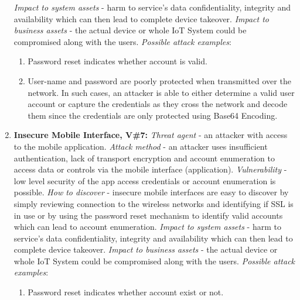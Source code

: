 \documentclass[12pt]{article}
\begin{document}
\begin{enumerate}
		\newline \textit{Impact to system assets} - harm to service’s data confidentiality, integrity and availability	which can then lead to complete device takeover.
		\newline \textit{Impact to business assets} - the actual device or whole IoT System could be compromised along with the users.
		\newline \textit{Possible attack examples}:
		\begin{enumerate}[label=(\roman*)]
			\item Password reset indicates whether account is valid.
			\item User-name and password are poorly protected when transmitted over the network. In such cases, an attacker is able to either determine a valid user account or capture the credentials as they cross the network and decode them since the credentials are only protected using	Base64 Encoding.
		\end{enumerate}
	\item \textbf{Insecure Mobile Interface, V\#7:}
		\newline \textit{Threat agent} - an attacker with access to the mobile application.
		\newline \textit{Attack method} - an attacker uses insufficient authentication, lack of transport encryption and account enumeration to access data or controls via the mobile interface (application).
		\newline \textit{Vulnerability} - low level security of the app access credentials or account enumeration is possible.
		\newline \textit{How to discover} - insecure mobile interfaces are easy to discover by simply reviewing connection to the wireless networks and identifying if SSL is in use or by using the password reset mechanism to identify valid accounts which can lead to account enumeration.
		\newline \textit{Impact to system assets} - harm to service’s data confidentiality, integrity and availability which can then lead to complete device takeover.
		\newline \textit{Impact to business assets} - the actual device or whole IoT System could be compromised along with the users.
		\newline \textit{Possible attack examples}:
		\begin{enumerate}[label=(\roman*)]
			\item Password reset indicates whether account exist or not.

\end{enumerate}
\end{enumerate}
\end{document}
